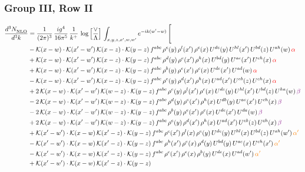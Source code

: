\documentclass[9pt]{article}
\numberwithin{equation}{section}
\begin{document}
\subsubsection{Group III, Row II}
\begin{align}
     \frac{d^{3}N_{\rm NLO}^{\rm}}{d^{3}k}  & = \frac{1}{(2\pi)^{3}}\, \frac{ig^{4}}{16\pi^{5}}\, \frac{1}{k^{+}}\, \log{\left[\frac{\vee}{\Lambda}\right]}\, \int_{x,y,z,x^{\prime},w,w^{\prime}}e^{-ik(w^{\prime}-w)}\, \Bigg[\notag \\ & -\mathcal{K}(x-w)\cdot \mathcal{K}(x'-w')\, \mathcal{K}(x-z)\cdot \mathcal{K}(y-z)\, f^{abc}\, \rho^{e}(y)\,\rho^{l}(x')\,\rho^{c}(x)\,U^{de}(y)\,U^{hl}(x')\,U^{bd}(z)\,U^{ah}(w)\, {\color{red}\alpha} \notag \\ & +\mathcal{K}(x-w)\cdot \mathcal{K}(x'-w')\, \mathcal{K}(x-z)\cdot \mathcal{K}(y-z)\, f^{abc}\, \rho^{d}(y)\,\rho^{e}(x')\,\rho^{h}(x)\,U^{bd}(y)\,U^{ae}(x')\,U^{ch}(x)\, {\color{red}\alpha} \notag \\ & + \mathcal{K}(x-w)\cdot \mathcal{K}(x'-w')\, \mathcal{K}(x-z)\cdot \mathcal{K}(y-z)\, f^{abc}\, \rho^{b}(y)\,\rho^{e}(x')\,\rho^{c}(x)\,U^{de}(x')\,U^{ad}(w)\, {\color{red}\alpha} \notag \\ & -\mathcal{K}(x-w)\cdot \mathcal{K}(x'-w')\, \mathcal{K}(x-z)\cdot \mathcal{K}(y-z)\, f^{abc}\, \rho^{e}(y)\,\rho^{d}(x')\,\rho^{h}(x)\,U^{ad}(x')\,U^{eb}(z)\,U^{ch}(x)\, {\color{red}\alpha} \notag \\ & +2\, \mathcal{K}(x-w)\cdot \mathcal{K}(x'-w')\, \mathcal{K}(w-z) \cdot \mathcal{K}(y-z)\, f^{abc}\, \rho^{e}(y)\,\rho^{l}(x')\, \rho^{c}(x)\, U^{de}(y)\,U^{hl}(x')\,U^{bd}(z)\,U^{ha}(w)\, {\color{violet} \beta} \notag \\ & -2\, \mathcal{K}(x-w)\cdot \mathcal{K}(x'-w')\, \mathcal{K}(w-z) \cdot \mathcal{K}(y-z)\, f^{abc}\, \rho^{d}(y)\,\rho^{e}(x')\, \rho^{h}(x)\, U^{db}(y)\,U^{ae}(x')\,U^{ch}(x)\, {\color{violet} \beta}\notag \\ & -2\, \mathcal{K}(x-w)\cdot \mathcal{K}(x'-w')\, \mathcal{K}(w-z) \cdot \mathcal{K}(y-z)\, f^{abc}\, \rho^{b}(y)\,\rho^{e}(x')\, \rho^{c}(x)\, U^{de}(x')\,U^{da}(w)\, {\color{violet} \beta}\notag \\ & + 2\, \mathcal{K}(x-w)\cdot \mathcal{K}(x'-w')\, \mathcal{K}(w-z) \cdot \mathcal{K}(y-z)\, f^{abc}\, \rho^{e}(y)\,\rho^{d}(x')\, \rho^{h}(x)\, U^{ad}(x')\,U^{eb}(z)\,U^{ch}(x)\, {\color{violet} \beta}\notag \\ & +\mathcal{K}(x'-w')\cdot\mathcal{K}(x-w)\,\mathcal{K}(x'-z)\cdot\mathcal{K}(y-z)\, f^{abc}\,\rho^{c}(x')\,\rho^{l}(x)\,\rho^{e}(y)\,U^{de}(y)\,U^{hl}(x)\,U^{bd}(z)\,U^{ah}(w')\,{\color{orange} \alpha'}\notag\\ & -\mathcal{K}(x'-w')\cdot\mathcal{K}(x-w)\,\mathcal{K}(x'-z)\cdot\mathcal{K}(y-z)\, f^{abc}\,\rho^{h}(x')\,\rho^{e}(x)\,\rho^{d}(y)\,U^{bd}(y)\,U^{ae}(x)\,U^{ch}(x')\,{\color{orange} \alpha'}\notag\\ &-\mathcal{K}(x'-w')\cdot\mathcal{K}(x-w)\,\mathcal{K}(x'-z)\cdot\mathcal{K}(y-z)\, f^{abc}\,\rho^{c}(x')\,\rho^{e}(x)\,\rho^{b}(y)\,U^{de}(x)\,U^{ad}(w')\,{\color{orange} \alpha'}\notag\\ & +\mathcal{K}(x'-w')\cdot\mathcal{K}(x-w)\,\mathcal{K}(x'-z)\cdot\mathcal{K}(y-z)\, 
\end{align}
\end{document}
